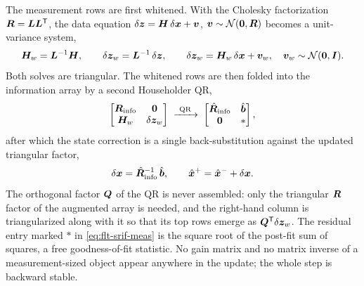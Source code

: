 The measurement rows are first whitened. With the Cholesky factorization
$\bm{R} = \bm{L}\bm{L}^{\mathsf{T}}$, the data equation
$\delta \bm{z} = \bm{H}\,\delta\bm{x} + \bm{v}$,
$\bm{v} \sim \mathcal{N}(\bm{0}, \bm{R})$ becomes a unit-variance system,
\begin{equation}
  \label{eq:flt-srif-whiten}
  \bm{H}_w = \bm{L}^{-1}\bm{H},
  \qquad
  \delta \bm{z}_w = \bm{L}^{-1}\,\delta \bm{z},
  \qquad
  \delta \bm{z}_w = \bm{H}_w\,\delta \bm{x} + \bm{v}_w,
  \quad \bm{v}_w \sim \mathcal{N}(\bm{0}, \bm{I}) .
\end{equation}
Both solves are triangular. The whitened rows are then folded into the
information array by a second Householder QR,
\begin{equation}
  \label{eq:flt-srif-meas}
  \begin{bmatrix}
    \bm{R}_{\text{info}} & \bm{0} \\
    \bm{H}_w & \delta \bm{z}_w
  \end{bmatrix}
  \;\xrightarrow{\ \text{QR}\ }\;
  \begin{bmatrix}
    \hat{\bm{R}}_{\text{info}} & \hat{\bm{b}} \\
    \bm{0} & *
  \end{bmatrix} ,
\end{equation}
after which the state correction is a single back-substitution against the
updated triangular factor,
\begin{equation}
  \label{eq:flt-srif-dx}
  \delta \bm{x} = \hat{\bm{R}}_{\text{info}}^{-1}\,\hat{\bm{b}},
  \qquad
  \hat{\bm{x}}^{+} = \hat{\bm{x}}^{-} + \delta \bm{x} .
\end{equation}
The orthogonal factor $\bm{Q}$ of the QR is never assembled: only the
triangular $\bm{R}$ factor of the augmented array is needed, and the
right-hand column is triangularized along with it so that its top rows emerge
as $\bm{Q}^{\mathsf{T}} \delta \bm{z}_w$. The residual entry marked $*$ in
\cref{eq:flt-srif-meas} is the square root of the post-fit sum of squares, a
free goodness-of-fit statistic. No gain matrix and no matrix inverse of a
measurement-sized object appear anywhere in the update; the whole step is
backward stable.

